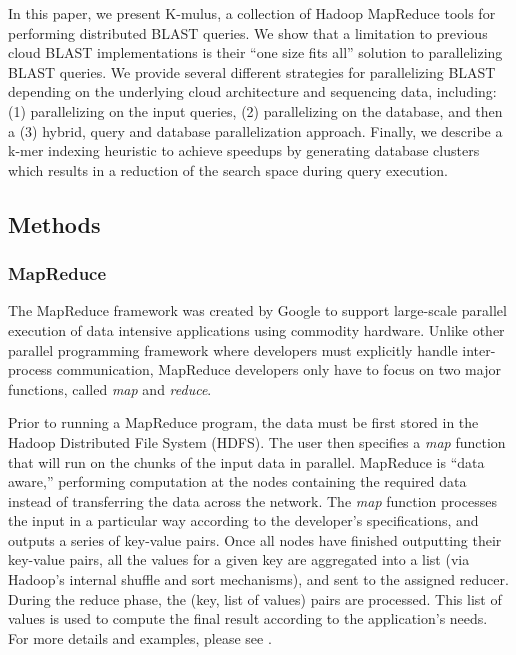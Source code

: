 \documentclass[12pt,\mydriver]{thesis}
\begin{document}
In this paper, we present K-mulus, a collection of Hadoop MapReduce tools for performing distributed BLAST queries.
We show that a limitation to previous cloud BLAST implementations is their ``one size fits all'' solution to parallelizing BLAST queries.
We provide several different strategies for parallelizing BLAST depending on the underlying cloud architecture and sequencing data, including: (1) parallelizing on the input queries, (2) parallelizing on the database, and then a (3) hybrid, query and database parallelization approach.
Finally, we describe a k-mer indexing heuristic to achieve speedups by generating database clusters which results in a reduction of the search space during query execution.



\subsection{Methods}


\subsubsection{MapReduce}
The MapReduce framework was created by Google to support large-scale parallel execution of data intensive applications using commodity hardware\cite{dean2008mapreduce}.
Unlike other parallel programming framework where developers must explicitly handle inter-process communication, MapReduce developers only have to focus on two major functions, called \emph{map} and \emph{reduce}.

Prior to running a MapReduce program, the data must be first stored in the Hadoop Distributed File System (HDFS).
The user then specifies a \emph{map} function that will run on the chunks of the input data in parallel.
MapReduce is ``data aware,'' performing computation at the nodes containing the required data instead of transferring the data across the network.
The \emph{map} function processes the input in a particular way according to the developer’s specifications, and outputs a series of key-value pairs. Once all nodes have finished outputting their key-value pairs, all the values for a given key are aggregated into a list (via Hadoop's internal shuffle and sort mechanisms), and sent to the assigned reducer. During the reduce phase, the (key, list of values) pairs are processed. This list of values is used to compute the final result according to the application’s needs.
For more details and examples, please see \cite{dean2008mapreduce}.
\end{document}
